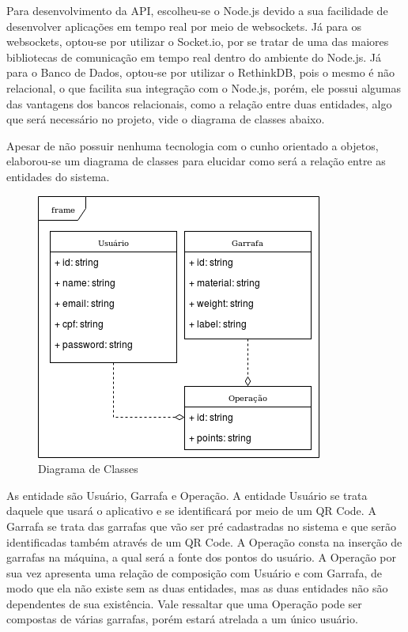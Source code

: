 \begin{apendicesenv}
Para desenvolvimento da API, escolheu-se o Node.js devido a sua facilidade de desenvolver aplicações em tempo real por meio de websockets. Já para os websockets, optou-se por utilizar o Socket.io, por se tratar de uma das maiores bibliotecas de comunicação em tempo real dentro do ambiente do Node.js. Já para o Banco de Dados, optou-se por utilizar o RethinkDB, pois o mesmo é não relacional, o que facilita sua integração com o Node.js, porém, ele possui algumas das vantagens dos bancos relacionais, como a relação entre duas entidades, algo que será necessário no projeto, vide o diagrama de classes abaixo.

Apesar de não possuir nenhuma tecnologia com o cunho orientado a objetos, elaborou-se um diagrama de classes para elucidar como será a relação entre as entidades do sistema.

\begin{figure}[!ht]
	\centering
		\includegraphics[scale=0.6]{figuras/software/4-diagrama-de-classes.png}
	\caption{Diagrama de Classes}
\end{figure}

As entidade são Usuário, Garrafa e Operação. A entidade Usuário se trata daquele que usará o aplicativo e se identificará por meio de um QR Code. A Garrafa se trata das garrafas que vão ser pré cadastradas no sistema e que serão identificadas também através de um QR Code. A Operação consta na inserção de garrafas na máquina, a qual será a fonte dos pontos do usuário. A Operação por sua vez apresenta uma relação de composição com Usuário e com Garrafa, de modo que ela não existe sem as duas entidades, mas as duas entidades não são dependentes de sua existência. Vale ressaltar que uma Operação pode ser compostas de várias garrafas, porém estará atrelada a um único usuário.


\end{apendicesenv}
